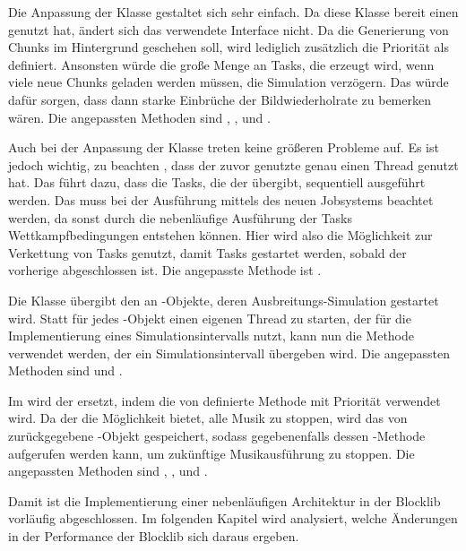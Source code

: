 Die Anpassung der Klasse  gestaltet sich sehr einfach. Da diese Klasse bereit einen  genutzt hat, ändert sich das verwendete Interface nicht. Da die Generierung von Chunks im Hintergrund geschehen soll, wird lediglich zusätzlich die Priorität als  definiert. Ansonsten würde die große Menge an Tasks, die erzeugt wird, wenn viele neue Chunks geladen werden müssen, die Simulation verzögern. Das würde dafür sorgen, dass dann starke Einbrüche der Bildwiederholrate zu bemerken wären. Die angepassten Methoden sind	, ,  und .

Auch bei der Anpassung der Klasse  treten keine größeren Probleme auf. Es ist jedoch wichtig, zu beachten , dass der zuvor genutzte  genau einen Thread genutzt hat. Das führt dazu, dass die Tasks, die der  übergibt, sequentiell ausgeführt werden. Das muss bei der Ausführung mittels des neuen Jobsystems beachtet werden, da sonst durch die nebenläufige Ausführung der Tasks Wettkampfbedingungen entstehen können. Hier wird also die Möglichkeit zur Verkettung von Tasks genutzt, damit Tasks gestartet werden, sobald der vorherige abgeschlossen ist. Die angepasste Methode ist .

Die Klasse  übergibt den  an -Objekte, deren Ausbreitungs-Simulation gestartet wird. Statt für jedes -Objekt einen eigenen Thread zu starten, der  für die Implementierung eines Simulationsintervalls nutzt, kann nun die Methode  verwendet werden, der ein Simulationsintervall übergeben wird. Die angepassten Methoden sind  und .

Im  wird der  ersetzt, indem die von  definierte Methode  mit Priorität  verwendet wird. Da der  die Möglichkeit bietet, alle Musik zu stoppen, wird das von  zurückgegebene -Objekt gespeichert, sodass gegebenenfalls dessen -Methode aufgerufen werden kann, um zukünftige Musikausführung zu stoppen. Die angepassten Methoden sind , ,  und .

Damit ist die Implementierung einer nebenläufigen Architektur in der Blocklib vorläufig abgeschlossen. Im folgenden Kapitel wird analysiert, welche Änderungen in der Performance der Blocklib sich daraus ergeben.